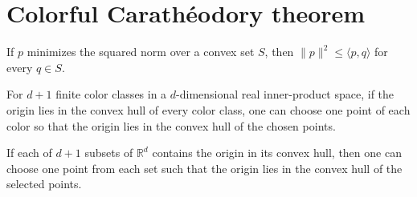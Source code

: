 \section{Colorful Carath\'eodory theorem}

\begin{lemma}
\label{lem:colorful-caratheodory-support}
\leanok
If $p$ minimizes the squared norm over a convex set $S$, then
$\|p\|^2\leq \langle p,q\rangle$ for every $q\in S$.
\end{lemma}

\begin{theorem}
\label{thm:colorful-caratheodory-finite-zero}
\leanok
{}
For $d+1$ finite color classes in a $d$-dimensional real inner-product space,
if the origin lies in the convex hull of every color class, one can choose one
point of each color so that the origin lies in the convex hull of the chosen
points.
\end{theorem}

\begin{theorem}
\label{thm:colorful-caratheodory}
\leanok
{}
If each of $d+1$ subsets of $\mathbb R^d$ contains the origin in its convex hull,
then one can choose one point from each set such that the origin lies in the
convex hull of the selected points.
\end{theorem}
